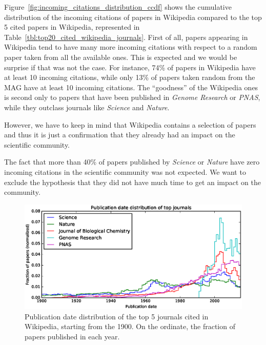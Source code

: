 Figure~\ref{fig:incoming_citations_distribution_ccdf} shows the cumulative distribution of the incoming citations of papers in Wikipedia compared to the top 5 cited papers in Wikipedia, represented in Table~\ref{tbl:top20_cited_wikipedia_journals}.
First of all, papers appearing in Wikipedia tend to have many more incoming citations with respect to a random paper taken from all the available ones.
This is expected and we would be surprise if that was not the case.
For instance, 74\% of papers in Wikipedia have at least 10 incoming citations, while only 13\% of papers taken random from the \ac{MAG} have at least 10 incoming citations.
The ``goodness'' of the Wikipedia ones is second only to papers that have been published in \emph{Genome Research} or \emph{PNAS}, while they outclass journals like \emph{Science} and \emph{Nature}.

However, we have to keep in mind that Wikipedia contains a selection of papers and thus it is just a confirmation that they already had an impact on the scientific community.

The fact that more than 40\% of papers published by \emph{Science} or \emph{Nature} have zero incoming citations in the scientific community was not expected.
We want to exclude the hypothesis that they did not have much time to get an impact on the community.

\begin{figure}[h]
\centering
\includegraphics[keepaspectratio=true, width=\textwidth]{assets/publication_date_distribution_journals}
\caption{Publication date distribution of the top 5 journals cited in Wikipedia, starting from the 1900.
On the ordinate, the fraction of papers published in each year.}
\label{fig:publication_date_distribution_journals}
\end{figure}

